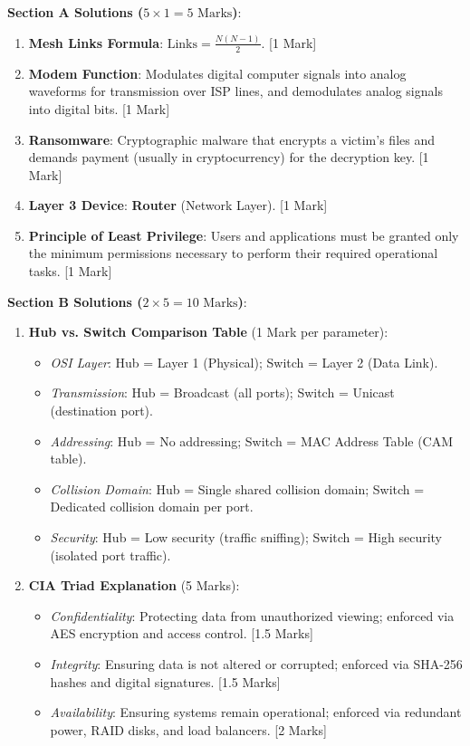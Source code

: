 \begin{solutionbox}
\noindent\textbf{Section A Solutions ($5 \times 1 = 5\text{ Marks}$)}:
\begin{enumerate}
    \item \textbf{Mesh Links Formula}: $\text{Links} = \frac{N(N-1)}{2}$. [1 Mark]
    \item \textbf{Modem Function}: Modulates digital computer signals into analog waveforms for transmission over ISP lines, and demodulates analog signals into digital bits. [1 Mark]
    \item \textbf{Ransomware}: Cryptographic malware that encrypts a victim's files and demands payment (usually in cryptocurrency) for the decryption key. [1 Mark]
    \item \textbf{Layer 3 Device}: \textbf{Router} (Network Layer). [1 Mark]
    \item \textbf{Principle of Least Privilege}: Users and applications must be granted only the minimum permissions necessary to perform their required operational tasks. [1 Mark]
\end{enumerate}

\medskip
\noindent\textbf{Section B Solutions ($2 \times 5 = 10\text{ Marks}$)}:
\begin{enumerate}[start=6]
    \item \textbf{Hub vs. Switch Comparison Table} (1 Mark per parameter):
    \begin{itemize}
        \item \textit{OSI Layer}: Hub = Layer 1 (Physical); Switch = Layer 2 (Data Link).
        \item \textit{Transmission}: Hub = Broadcast (all ports); Switch = Unicast (destination port).
        \item \textit{Addressing}: Hub = No addressing; Switch = MAC Address Table (CAM table).
        \item \textit{Collision Domain}: Hub = Single shared collision domain; Switch = Dedicated collision domain per port.
        \item \textit{Security}: Hub = Low security (traffic sniffing); Switch = High security (isolated port traffic).
    \end{itemize}

    \item \textbf{CIA Triad Explanation} (5 Marks):
    \begin{itemize}
        \item \textit{Confidentiality}: Protecting data from unauthorized viewing; enforced via AES encryption and access control. [1.5 Marks]
        \item \textit{Integrity}: Ensuring data is not altered or corrupted; enforced via SHA-256 hashes and digital signatures. [1.5 Marks]
        \item \textit{Availability}: Ensuring systems remain operational; enforced via redundant power, RAID disks, and load balancers. [2 Marks]
    \end{itemize}
\end{enumerate}


\end{solutionbox}
